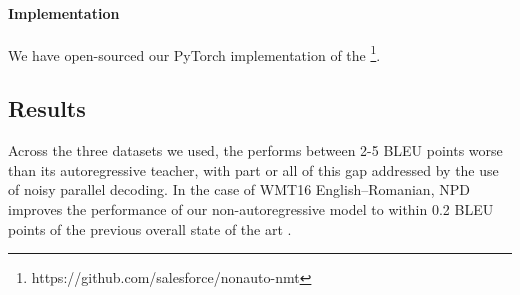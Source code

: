 \documentclass{article} \usepackage{iclr2018_conference,times}
\begin{document}
\vspace{-5pt}
\paragraph{Implementation} We have open-sourced our PyTorch implementation of the \model{}\footnote{https://github.com/salesforce/nonauto-nmt}.

\subsection{Results}
Across the three datasets we used, the \model{} performs between 2-5 BLEU points worse than its autoregressive teacher, with part or all of this gap addressed by the use of noisy parallel decoding. In the case of WMT16 English--Romanian, NPD improves the performance of our non-autoregressive model to within 0.2 BLEU points of the previous overall state of the art \citep{gehring2017convolutional}.
\end{document}
